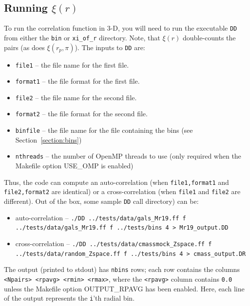 \documentclass[12pt,titlepage,justified]{article}
\newcommand{\xir}{\ensuremath{{\xi(r)}}\xspace}
\newcommand{\xirppi}{\ensuremath{{\xi(r_p,\pi)}}\xspace}
\begin{document}
\subsection{Running \texorpdfstring{\xir}{xi(r)}}
To run the correlation function in 3-D, you will need to run the executable \texttt{DD} from either the \texttt{bin} or \texttt{xi\_of\_r} directory. Note, that 
\xir double-counts the pairs (as does \xirppi). The inputs to \texttt{DD} are:
\begin{itemize}
\item \texttt{file1}   -- the file name for the first file.
\item \texttt{format1} -- the file format for the first file.
\item \texttt{file2}   -- the file name for the second file.
\item \texttt{format2} -- the file format for the second file.
\item \texttt{binfile} -- the file name for the file containing the bins (see Section~\ref{section:bins})
\item \texttt{nthreads} -- the number of OpenMP threads to use (only required when the Makefile option USE\_OMP is enabled)
\end{itemize}
Thus, the code can compute an auto-correlation (when \texttt{file1,format1} and \texttt{file2,format2} are identical) or a cross-correlation (when \texttt{file1} and \texttt{file2} are different). Out of the box, 
some sample \texttt{DD} call directory) can be:
\begin{itemize}
\item auto-correlation --  {\scriptsize \texttt{./DD  ../tests/data/gals\_Mr19.ff f ../tests/data/gals\_Mr19.ff f ../tests/bins 4 > Mr19\_output.DD}}
\item cross-correlation -- {\scriptsize \texttt{./DD ../tests/data/cmassmock\_Zspace.ff f ../tests/data/random\_Zspace.ff f ../tests/bins 4 > cmass\_output.DR}}
\end{itemize}
The output (printed to stdout) has \texttt{nbins} rows; each row contains the columns \texttt{<Npairs> <rpavg> <rmin> <rmax>}, where the \texttt{<rpavg>} column contains \texttt{0.0} unless the 
Makefile option OUTPUT\_RPAVG has been enabled. Here, each line of the output represents the \texttt{i}'th radial bin. 
\end{document}
